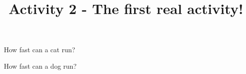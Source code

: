 \documentclass{ximera}
\title{Activity 2 - The first real activity!}
\begin{document}
\maketitle


\begin{problem}
    How fast can a cat run?
    \begin{multipleChoice}
    \end{multipleChoice}
\end{problem}

\begin{question}
        How fast can a dog run?
    \begin{multipleChoice}
    \end{multipleChoice}
\end{question}
\end{document}
